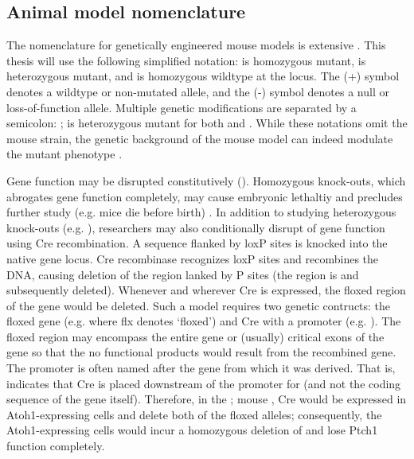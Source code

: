 \subsection{Animal model nomenclature}

The nomenclature for genetically engineered mouse models is extensive . This thesis will use the following simplified notation: \high{-/-} is homozygous mutant, \high{+/-} is heterozygous mutant, and \high{+/+} is homozygous wildtype at the  locus. The (+) symbol denotes a wildtype or non-mutated allele, and the (-) symbol denotes a null or loss-of-function allele. Multiple genetic modifications are separated by a semicolon: \high{+/-};\high{+/-} is heterozygous mutant for both  and . While these notations omit the mouse strain, the genetic background of the mouse model can indeed modulate the mutant phenotype .

Gene function may be disrupted constitutively (). Homozygous knock-outs, which abrogates gene function completely, may cause embryonic lethaltiy and precludes further study (e.g. \high{-/-} mice die before birth) . In addition to studying heterozygous knock-outs (e.g. \high{+/-}), researchers may also conditionally disrupt of gene function using Cre recombination. A sequence flanked by loxP sites is knocked into the native gene locus. Cre recombinase recognizes loxP sites and recombines the DNA, causing deletion of the region lanked by P sites (the region is  and subsequently deleted). Whenever and wherever Cre is expressed, the floxed region of the gene would be deleted. Such a model requires two genetic contructs: the floxed gene (e.g.  where flx denotes `floxed') and Cre with a promoter (e.g. ). The floxed region may encompass the entire gene or (usually) critical exons of the gene so that the no functional products would result from the recombined gene. The promoter is often named after the gene from which it was derived. That is,  indicates that Cre is placed downstream of the promoter for  (and not the coding sequence of the  gene itself). Therefore, in the ; mouse , Cre would be expressed in Atoh1-expressing cells and delete both of the floxed  alleles; consequently, the Atoh1-expressing cells would incur a homozygous deletion of  and lose Ptch1 function completely.
		

